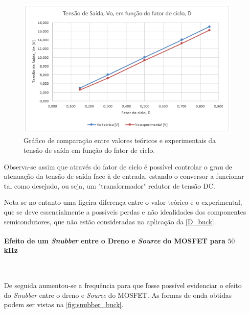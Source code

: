 \documentclass[a4paper,11pt]{article}
\numberwithin{equation}{section}
\begin{document}
\begin{figure}[H]
	\centering
	\includegraphics[keepaspectratio=true, scale=1.0]{teoricas/graf_buck}
	\caption{Gráfico de comparação entre valores teóricos e experimentais da tensão de saída em função do fator de ciclo.}
	\label{fig:graf_buck}
	\vspace{-0.8em}
\end{figure}

Observa-se assim que através do fator de ciclo é possível controlar o grau de atenuação da tensão de saída face à de entrada, estando o conversor a funcionar tal como desejado, ou seja, um "transformador" redutor de tensão DC.

Nota-se no entanto uma ligeira diferença entre o valor teórico e o experimental, que se deve essencialmente a possíveis perdas e não idealidades dos componentes semicondutores, que não estão consideradas na aplicação da \autoref{D_buck}.

\paragraph{Efeito de um \textit{Snubber} entre o Dreno e \textit{Source} do MOSFET para $50$ kHz}\mbox{}\

De seguida aumentou-se a frequência para que fosse possível evidenciar o efeito do \textit{Snubber} entre o dreno e \textit{Source} do MOSFET. As formas de onda obtidas podem ser vistas na \autoref{fig:snubber_buck}.
\end{document}
